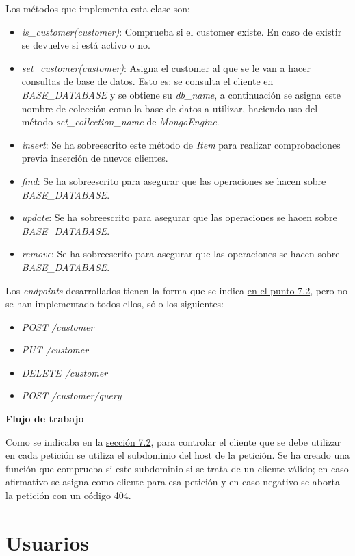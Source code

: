\bigskip
Los métodos que implementa esta clase son:
\begin{itemize}
	\item \textit{is\_customer(customer)}: Comprueba si el customer existe. En caso de existir se devuelve si está activo o no.
	\item \textit{set\_customer(customer)}: Asigna el customer al que se le van a hacer consultas de base de datos. Esto es: se consulta el cliente en \textit{BASE\_DATABASE} y se obtiene su \textit{db\_name}, a continuación se asigna este nombre de colección como la base de datos a utilizar, haciendo uso del método \textit{set\_collection\_name} de \textit{MongoEngine}.
	\item \textit{insert}: Se ha sobreescrito este método de \textit{Item} para realizar comprobaciones previa inserción de nuevos clientes.
	\item \textit{find}: Se ha sobreescrito para asegurar que las operaciones se hacen sobre \textit{BASE\_DATABASE}.
	\item \textit{update}: Se ha sobreescrito para asegurar que las operaciones se hacen sobre \textit{BASE\_DATABASE}.
	\item \textit{remove}: Se ha sobreescrito para asegurar que las operaciones se hacen sobre \textit{BASE\_DATABASE}.
\end{itemize}


\bigskip
Los \textit{endpoints} desarrollados tienen la forma que se indica \hyperref[sec:servicios]{en el punto 7.2}, pero no se han implementado todos ellos, sólo los siguientes:
\begin{itemize}
	\item \textit{POST /customer}
	\item \textit{PUT /customer}
	\item \textit{DELETE /customer}
	\item \textit{POST /customer/query}
\end{itemize}


\bigskip
\textbf{Flujo de trabajo}

Como se indicaba en la \hyperref[sec:servicios]{sección 7.2}, para controlar el cliente que se debe utilizar en cada petición se utiliza el subdominio del host de la petición. Se ha creado una función que comprueba si este subdominio si se trata de un cliente válido; en caso afirmativo se asigna como cliente para esa petición y en caso negativo se aborta la petición con un código 404.




\section{Usuarios}


